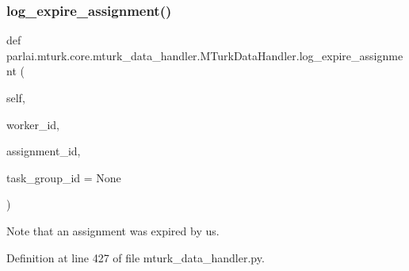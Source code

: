 \subsubsection{\texorpdfstring{log\+\_\+expire\+\_\+assignment()}{log\_expire\_assignment()}}
{\footnotesize\ttfamily def parlai.\+mturk.\+core.\+mturk\+\_\+data\+\_\+handler.\+M\+Turk\+Data\+Handler.\+log\+\_\+expire\+\_\+assignment (\begin{DoxyParamCaption}\item[{}]{self,  }\item[{}]{worker\+\_\+id,  }\item[{}]{assignment\+\_\+id,  }\item[{}]{task\+\_\+group\+\_\+id = {\ttfamily None} }\end{DoxyParamCaption})}

\begin{DoxyVerb}Note that an assignment was expired by us.
\end{DoxyVerb}
 

Definition at line 427 of file mturk\+\_\+data\+\_\+handler.\+py.


